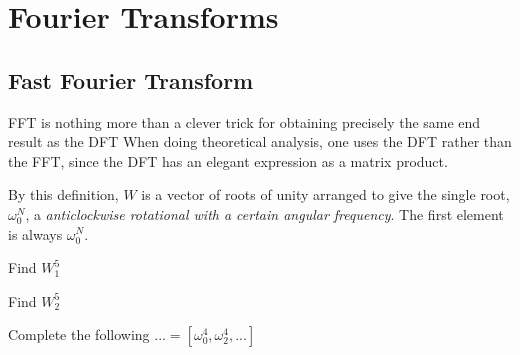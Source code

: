 
\chapter{Fourier Transforms}


\section{Fast Fourier Transform}

FFT is nothing more than a clever trick for obtaining precisely the same end result as the DFT
When doing theoretical analysis, one uses the DFT rather than the FFT, since the DFT
has an elegant expression as a matrix product.


By this definition, $W$ is a vector of roots of unity arranged to give the
single root, $\omega^N_0$, a \textit{anticlockwise rotational with a certain angular frequency}.
The first element is always $\omega^N_0$. 

\begin{example}
Find $W^5_1$
\end{example}

\begin{example}
Find $W^5_2$
\end{example}

\begin{example}
Complete the following $... = [\omega^4_0,\omega^4_2, ... ]$
\end{example}